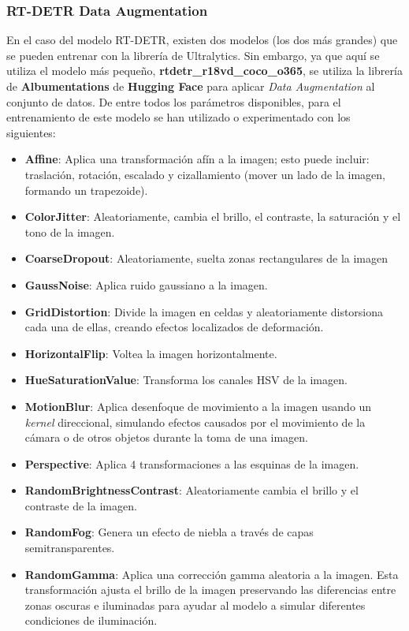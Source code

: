 \documentclass[12pt,a4paper,onecolumn,oneside]{report}
\begin{document}
\subsubsection{RT-DETR Data Augmentation}

En el caso del modelo RT-DETR, existen dos modelos (los dos más grandes) que se pueden entrenar con la librería de Ultralytics. Sin embargo, ya que aquí se utiliza el modelo más pequeño, \textbf{rtdetr\_r18vd\_coco\_o365}, se utiliza la librería de \textbf{Albumentations} de \textbf{Hugging Face} para aplicar \textit{Data Augmentation} al conjunto de datos. De entre todos los parámetros disponibles, para el entrenamiento de este modelo se han utilizado o experimentado con los siguientes:

\begin{itemize}
    \item \textbf{Affine}: Aplica una transformación afín a la imagen; esto puede incluir: traslación, rotación, escalado y cizallamiento (mover un lado de la imagen, formando un trapezoide).
    \item \textbf{ColorJitter}: Aleatoriamente, cambia el brillo, el contraste, la saturación y el tono de la imagen.
    \item \textbf{CoarseDropout}: Aleatoriamente, suelta zonas rectangulares de la imagen 
    \item \textbf{GaussNoise}: Aplica ruido gaussiano a la imagen.
    \item \textbf{GridDistortion}: Divide la imagen en celdas y aleatoriamente distorsiona cada una de ellas, creando efectos localizados de deformación.
    \item \textbf{HorizontalFlip}: Voltea la imagen horizontalmente.
    \item \textbf{HueSaturationValue}: Transforma los canales HSV de la imagen.
    \item \textbf{MotionBlur}: Aplica desenfoque de movimiento a la imagen usando un \textit{kernel} direccional, simulando efectos causados por el movimiento de la cámara o de otros objetos durante la toma de una imagen.
    \item \textbf{Perspective}: Aplica 4 transformaciones a las esquinas de la imagen.
    \item \textbf{RandomBrightnessContrast}: Aleatoriamente cambia el brillo y el contraste de la imagen.
    \item \textbf{RandomFog}: Genera un efecto de niebla a través de capas semitransparentes.
    \item \textbf{RandomGamma}: Aplica una corrección gamma aleatoria a la imagen. Esta transformación ajusta el brillo de la imagen preservando las diferencias entre zonas oscuras e iluminadas para ayudar al modelo a simular diferentes condiciones de iluminación.

\end{itemize}
\end{document}
